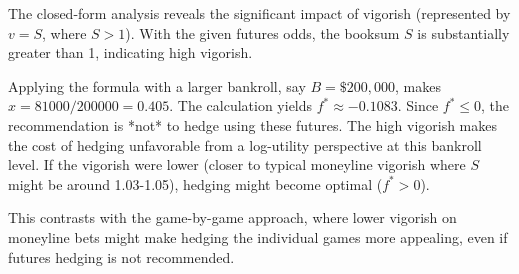 \documentclass{article}
\begin{document}
The closed-form analysis reveals the significant impact of vigorish (represented by $v=S$, where $S > 1$). With the given futures odds, the booksum $S$ is substantially greater than 1, indicating high vigorish. 

Applying the formula with a larger bankroll, say $B = \$200,000$, makes $x = 81000 / 200000 = 0.405$. The calculation yields $f^* \approx -0.1083$. Since $f^* \le 0$, the recommendation is *not* to hedge using these futures. The high vigorish makes the cost of hedging unfavorable from a log-utility perspective at this bankroll level. If the vigorish were lower (closer to typical moneyline vigorish where $S$ might be around 1.03-1.05), hedging might become optimal ($f^* > 0$).

This contrasts with the game-by-game approach, where lower vigorish on moneyline bets might make hedging the individual games more appealing, even if futures hedging is not recommended.
\end{document}
